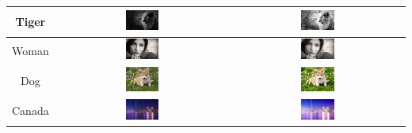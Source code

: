 \documentclass[12pt,a4paper]{article}
\begin{document}
\begin{center}
\begin{longtable}{|c|c|c|}
    Tiger & \includegraphics[width=0.2\textwidth]{./latexSource/tiger_origin.png} & 
           \includegraphics[width=0.2\textwidth]{./latexSource/tiger_process.png} \\
    \hline
    Woman & \includegraphics[width=0.2\textwidth]{./latexSource/woman_origin.png} &
           \includegraphics[width=0.2\textwidth]{./latexSource/woman_process.png} \\
    \hline
    Dog & \includegraphics[width=0.2\textwidth]{./latexSource/dog_origin.png} & 
           \includegraphics[width=0.2\textwidth]{./latexSource/dog_process.png} \\ 
    \hline
    Canada & \includegraphics[width=0.2\textwidth]{./latexSource/Canada_origin.png} & 
           \includegraphics[width=0.2\textwidth]{./latexSource/Canada_process.png} \\ 
    \hline
    \end{longtable}
 \end{center}
\end{document}
